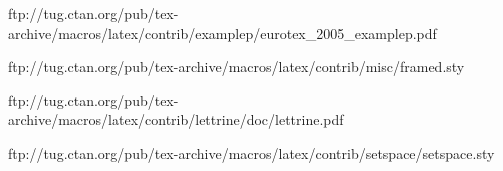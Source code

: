 ftp://tug.ctan.org/pub/tex-archive/macros/latex/contrib/examplep/eurotex_2005_examplep.pdf


\usepackage{units}




ftp://tug.ctan.org/pub/tex-archive/macros/latex/contrib/misc/framed.sty

\makeatletter
{}
\makeatother




ftp://tug.ctan.org/pub/tex-archive/macros/latex/contrib/lettrine/doc/lettrine.pdf




\usepackage{multicol}



\usepackage{ellipsis} %

%
ftp://tug.ctan.org/pub/tex-archive/macros/latex/contrib/setspace/setspace.sty
\usepackage{setspace}

